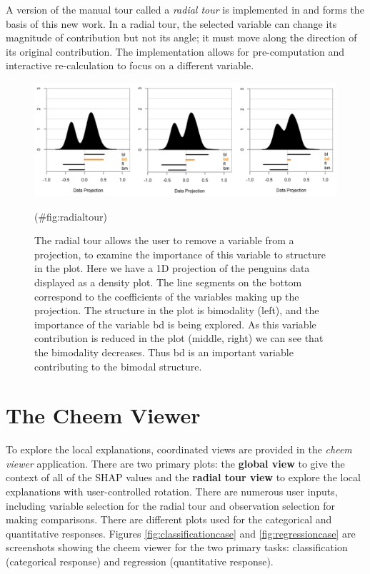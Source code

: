 \documentclass[
]{jss}
\begin{document}
A version of the manual tour called a \emph{radial tour} is implemented in \citet{spyrison_spinifex_2020} and forms the basis of this new work. In a radial tour, the selected variable can change its magnitude of contribution but not its angle; it must move along the direction of its original contribution. The implementation allows for pre-computation and interactive re-calculation to focus on a different variable.

\begin{CodeChunk}
\begin{figure}

{\centering \includegraphics[width=0.99\linewidth]{./figures/radial_tour} 

}

\caption{The radial tour allows the user to remove a variable from a projection, to examine the importance of this variable to structure in the plot. Here we have a 1D projection of the penguins data displayed as a density plot. The line segments on the bottom correspond to the coefficients of the variables making up the projection. The structure in the plot is bimodality (left), and the importance of the variable \textsf{bd} is being explored. As this variable contribution is reduced in the plot (middle, right) we can see that the bimodality decreases. Thus \textsf{bd} is an important variable contributing to the bimodal structure.}(\#fig:radialtour)
\end{figure}
\end{CodeChunk}

\hypertarget{sec:cheemviewer}{%
\section{The Cheem Viewer}\label{sec:cheemviewer}}

To explore the local explanations, coordinated views \citep{roberts_state_2007} \citep[also known as ensemble graphics,][]{unwin_ensemble_2018} are provided in the \emph{cheem viewer} application. There are two primary plots: the \textbf{global view} to give the context of all of the SHAP values and the \textbf{radial tour view} to explore the local explanations with user-controlled rotation. There are numerous user inputs, including variable selection for the radial tour and observation selection for making comparisons. There are different plots used for the categorical and quantitative responses. Figures \ref{fig:classificationcase} and \ref{fig:regressioncase} are screenshots showing the cheem viewer for the two primary tasks: classification (categorical response) and regression (quantitative response).
\end{document}
